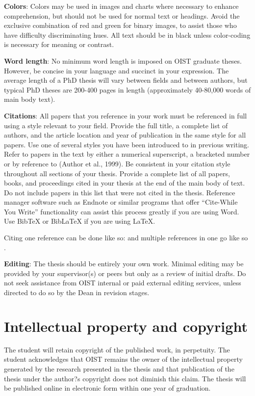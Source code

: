 \textbf{Colors}:  Colors may be used in images and charts where necessary to enhance comprehension, but should not be used for normal text or headings.  Avoid the exclusive combination of red and green for binary images, to assist those who have difficulty discriminating hues.  All text should be in black unless color-coding is necessary for meaning or contrast.

\textbf{Word length}:  No minimum word length is imposed on OIST graduate theses.  However, be concise in your language and succinct in your expression.  The average length of a PhD thesis will vary between fields and between authors, but typical PhD theses are 200-400 pages in length (approximately 40-80,000 words of main body text).  

\textbf{Citations}:  All papers that you reference in your work must be referenced in full using a style relevant to your field. Provide the full title, a complete list of authors, and the article location and year of publication in the same style for all papers. Use one of several styles you have been introduced to in previous writing.  Refer to papers in the text by either a numerical superscript, a bracketed number or by reference to (Author et al., 1999).  Be consistent in your citation style throughout all sections of your thesis.  Provide a complete list of all papers, books, and proceedings cited in your thesis at the end of the main body of text.  Do not include papers in this list that were not cited in the thesis.  Reference manager software such as Endnote or similar programs that offer ``Cite-While You Write'' functionality can assist this process greatly if you are using Word. Use BibTeX or BibLaTeX if you are using LaTeX.

Citing one reference can be done like so: \cite{Lee98} and multiple references in one go like so \cite{Fil09, Muc10, Kra27}.

\textbf{Editing}:  The thesis should be entirely your own work. Minimal editing may be provided by your supervisor(s) or peers but only as a review of initial drafts.  Do not seek assistance from OIST internal or paid external editing services, unless directed to do so by the Dean in revision stages.

\section{Intellectual property and copyright}

The student will retain copyright of the published work, in perpetuity.  The student acknowledges that OIST remains the owner of the intellectual property generated by the research presented in the thesis and that publication of the thesis under the author?s copyright does not diminish this claim.  The thesis will be published online in electronic form within one year of graduation.


